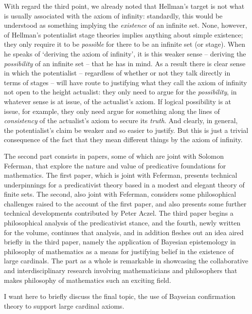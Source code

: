 \documentclass{asl}
\theoremstyle{definition}
\begin{document}
With regard the third point, we already noted that Hellman's target is not what is usually associated with the axiom of infinity: standardly, this would be understood as something implying the \emph{existence} of an infinite set. None, however, of Hellman's potentialist stage theories implies anything about simple existence; they only require it to be \emph{possible} for there to be an infinite set (or stage). When he speaks of `deriving the axiom of infinity', it is this weaker sense -- deriving the \emph{possibility} of an infinite set -- that he has in mind. As a result there is clear sense in which the potentialist -- regardless of whether or not they talk directly in terms of stages -- will have route to justifying what they call the axiom of infinity not open to the height actualist: they only need to argue for the \emph{possibility}, in whatever sense is at issue, of the actualist's axiom. If logical possibility is at issue, for example, they only need argue for something along the lines of \emph{consistency} of the actualist's axiom to secure its \emph{truth}. And clearly, in general, the potentialist's claim be weaker and so easier to justify. But this is just a trivial consequence of the fact that they mean different things by the axiom of infinity.

The second part consists in papers, some of which are joint with Solomon Feferman, that explore the nature and value of predicative foundations for mathematics. The first paper, which is joint with Feferman, presents technical underpinnings for a predicativist theory based in a modest and elegant theory of finite sets. The second, also joint with Feferman, considers some philosophical challenges raised to the account of the first paper, and also presents some further technical developments contributed by Peter Aczel. The third paper begins a philosophical analysis of the predicativist stance, and the fourth, newly written for the volume, continues that analysis, and in addition fleshes out an idea aired briefly in the third paper, namely the application of Bayesian epistemology in philosophy of mathematics as a means for justifying belief in the existence of large cardinals. The part as a whole is remarkable in showcasing the collaborative and interdisciplinary research involving mathematicians and philosophers that makes philosophy of mathematics such an exciting field.

I want here to briefly discuss the final topic, the use of Bayseian confirmation theory to support large cardinal axioms.
\end{document}
